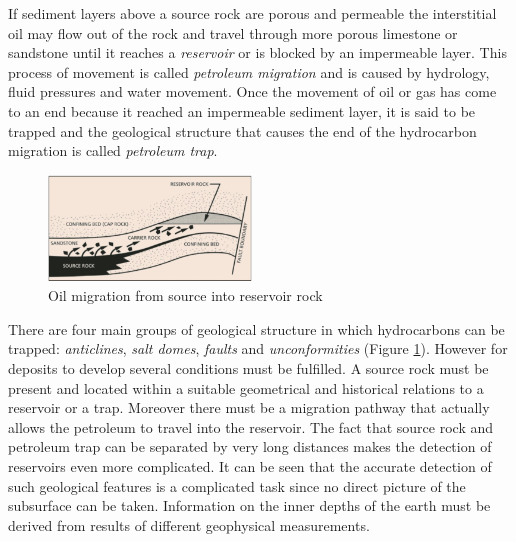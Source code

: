 \documentclass[twocolumn]{article}
\begin{document}
If sediment layers above a source rock are porous and permeable the interstitial oil may flow out of the rock and travel through more porous limestone or sandstone until it reaches a \textit{reservoir} or is blocked by an impermeable layer. This process of movement is called \textit{petroleum migration} and is caused by hydrology, fluid pressures and water movement. 
Once the movement of oil or gas has come to an end because it reached an impermeable sediment layer, it is said to be trapped and the geological structure that causes the end of the hydrocarbon migration is called \textit{petroleum trap}. 
\begin{figure}[htb]
        \centering
        \includegraphics[width=0.48\textwidth]{oilmigration}
        \caption{Oil migration from source into reservoir rock}
        \label{migration}
\end{figure}

There are four main groups of geological structure in which hydrocarbons can be trapped: \textit{anticlines}, \textit{salt domes}, \textit{faults} and \textit{unconformities} (Figure \ref{migration}). However for deposits to develop several conditions must be fulfilled. A source rock must be present and located within a suitable geometrical and historical relations to a reservoir or a trap. Moreover there must be a migration pathway that actually allows the petroleum to travel into the reservoir. The fact that source rock and petroleum trap can be separated by very long distances makes the detection of reservoirs even more complicated. It can be seen that the accurate detection of such geological features is a complicated task since no direct picture of the subsurface can be taken. Information on the inner depths of the earth must be derived from results of different geophysical measurements.
\end{document}
